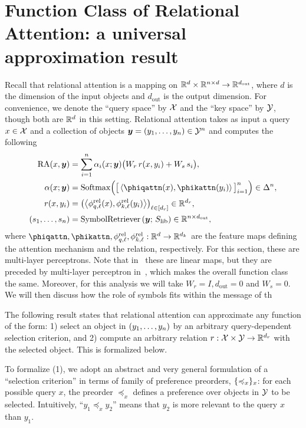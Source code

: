 \section{Function Class of Relational Attention: a universal approximation result}

Recall that relational attention is a mapping on $\mathbb{R}^d \times \mathbb{R}^{n \times d} \to \mathbb{R}^{d_{\mathrm{out}}}$, where $d$ is the dimension of the input objects and $d_{\mathrm{out}}$ is the output dimension. For convenience, we denote the ``query space'' by ${\mathcal{X}}$ and the ``key space'' by ${\mathcal{Y}}$, though both are $\mathbb{R}^d$ in this setting. Relational attention takes as input a query $x \in {\mathcal{X}}$ and a collection of objects $\bm{y} = (y_1, \ldots, y_n) \in {\mathcal{Y}}^n$ and computes the following
\begin{align}
  \RA(x, \y) &= \sum_{i=1}^{n} \alpha_i(x; \y) \bigparen{W_r \, r(x, y_i) + W_s \, s_i}, \\
  \alpha(x; \y) &= \Softmax\Bigparen{\bigbra{\iprod{\phiqattn(x)}{\phikattn(y_i)}}_{i=1}^{n}} \in \Delta^n, \\
  r(x, y_i) &= \paren{\iprod{\phi_{q,\ell}^{\rel}(x)}{\phi_{k,\ell}^{\rel}(y_i)}}_{\ell \in [d_r]} \in \reals^{d_r}, \\
  (s_1, \ldots, s_n) &= \SymbolRetriever\paren{\y;\, \Slib} \in \reals^{n \times d_{\mathrm{out}}},
\end{align}
where $\phiqattn, \phikattn, \phi_{q,\ell}^{\rel}, \phi_{k,\ell}^{\rel}: \reals^{d} \to \reals^{d_k}$ are the feature maps defining the attention mechanism and the relation, respectively. For this section, these are multi-layer perceptrons. Note that in~ these are linear maps, but they are preceded by multi-layer perceptron in~, which makes the overall function class the same. Moreover, for this analysis we will take $W_r = I, d_{\mathrm{out}} = 0$ and $W_s = 0$. We will then discuss how the role of symbols fits within the message of th

The following result states that relational attention can approximate any function of the form: 1) select an object in $(y_1, \ldots, y_n)$ by an arbitrary query-dependent selection criterion, and 2) compute an arbitrary relation $r: {\mathcal{X}} \times {\mathcal{Y}} \to \mathbb{R}^{d_r}$ with the selected object. This is formalized below.

To formalize (1), we adopt an abstract and very general formulation of a ``selection criterion'' in terms of family of preference preorders, $\{\preccurlyeq_x\}_x$: for each possible query $x$, the preorder $\preceq_x$ defines a preference over objects in ${\mathcal{Y}}$ to be selected. Intuitively, ``$y_1 \preceq_x y_2$'' means that $y_2$ is more relevant to the query $x$ than $y_1$.

